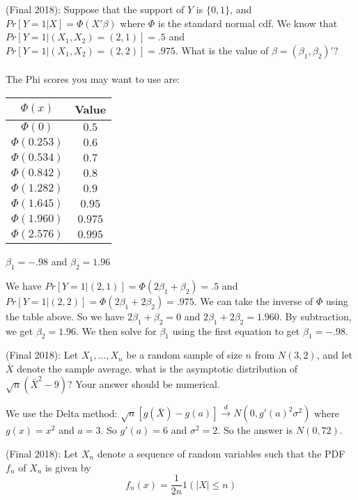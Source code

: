\documentclass[answers]{exam}
\begin{document}
\begin{questions}
\question (Final 2018): Suppose that the support of $Y$ is $\{0,1\}$, and $Pr[Y=1|X] = \Phi(X' \beta)$ where $\Phi$ is the standard normal cdf. We know that $Pr[Y=1|(X_1,X_2) = (2,1)] = .5$ and $Pr[Y=1|(X_1,X_2) = (2,2)] = .975$. What is the value of $\beta = (\beta_1,\beta_2)'$?\\\\
The Phi scores you may want to use are: \begin{tabular}{cc}
    \hline
    $\Phi(x)$ & Value \\ \hline
    $\Phi(0)$ & $0.5$ \\
    $\Phi(0.253)$ & $0.6$ \\
    $\Phi(0.534)$ & $0.7$ \\
    $\Phi(0.842)$ & $0.8$ \\
    $\Phi(1.282)$ & $0.9$ \\
    $\Phi(1.645)$ & $0.95$ \\
    $\Phi(1.960)$ & $0.975$ \\
    $\Phi(2.576)$ & $0.995$ \\
    \hline
    \end{tabular}
\begin{solution}
    $\beta_1 = -.98$ and $\beta_2 = 1.96$
    
    We have $Pr[Y=1|(2,1)] = \Phi(2\beta_1 + \beta_2) = .5$ and $Pr[Y=1|(2,2)] = \Phi(2\beta_1 + 2\beta_2) = .975$. We can take the inverse of $\Phi$ using the table above. So we have $2\beta_1 + \beta_2 = 0$ and $2\beta_1 + 2\beta_2 = 1.960$. By subtraction, we get $\beta_2 = 1.96$. We then solve for $\beta_1$ using the first equation to get $\beta_1 = -.98$.
    \end{solution}

\question (Final 2018): Let $X_1,...,X_n$ be a random sample of size $n$ from $N(3,2)$, and let $\bar{X}$ denote the sample average. what is the asymptotic distribution of $\sqrt{n}(\bar{X}^2-9)$? Your answer should be numerical.
\begin{solution}
    We use the Delta method: $\sqrt{n}[g(\bar{X}) - g(a)] \xrightarrow{d} N(0, g'(a)^2 \sigma^2)$ where $g(x) = x^2$ and $a = 3$. So $g'(a) = 6$ and $\sigma^2 = 2$. So the answer is $N(0, 72)$.
\end{solution}

\question (Final 2018): Let $X_n$ denote a sequence of random variables such that the PDF $f_n$ of $X_n$ is given by
$$f_n(x)=\frac{1}{2n}1(|X|\leq n)$$
\end{questions}
\end{document}
